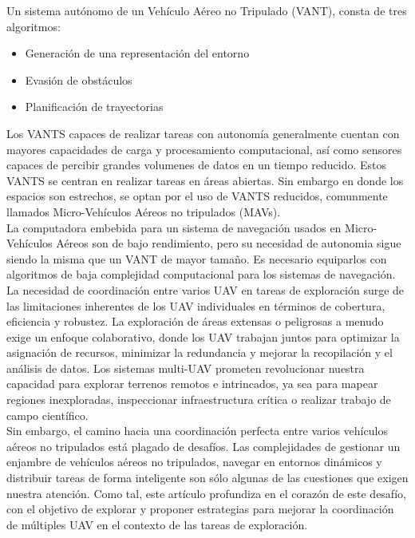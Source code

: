 \documentclass[sigconf]{acmart}
\begin{document}
Un sistema autónomo de un Vehículo Aéreo no Tripulado (VANT), consta de tres algoritmos:

\begin{itemize}
\item Generación de una representación del entorno
\item Evasión de obstáculos
\item Planificación de trayectorias
\end{itemize}

Los VANTS capaces de realizar tareas con autonomía generalmente cuentan con mayores capacidades de carga y procesamiento computacional, así como sensores capaces de percibir grandes volumenes de datos en un tiempo reducido. Estos VANTS se centran en realizar tareas en áreas abiertas. Sin embargo en donde los espacios son estrechos, se optan por el uso de VANTS reducidos, comunmente llamados Micro-Vehículos Aéreos no tripulados (MAVs).\\

La computadora embebida para un sistema de navegación usados en Micro-Vehículos Aéreos son de bajo rendimiento, pero su necesidad de autonomia sigue siendo la misma que un VANT de mayor tamaño. Es necesario equiparlos con algoritmos de baja complejidad computacional para los sistemas de navegación.\\

La necesidad de coordinación entre varios UAV en tareas de exploración surge de las limitaciones inherentes de los UAV individuales en términos de cobertura, eficiencia y robustez. La exploración de áreas extensas o peligrosas a menudo exige un enfoque colaborativo, donde los UAV trabajan juntos para optimizar la asignación de recursos, minimizar la redundancia y mejorar la recopilación y el análisis de datos. Los sistemas multi-UAV prometen revolucionar nuestra capacidad para explorar terrenos remotos e intrincados, ya sea para mapear regiones inexploradas, inspeccionar infraestructura crítica o realizar trabajo de campo científico.\\

Sin embargo, el camino hacia una coordinación perfecta entre varios vehículos aéreos no tripulados está plagado de desafíos. Las complejidades de gestionar un enjambre de vehículos aéreos no tripulados, navegar en entornos dinámicos y distribuir tareas de forma inteligente son sólo algunas de las cuestiones que exigen nuestra atención. Como tal, este artículo profundiza en el corazón de este desafío, con el objetivo de explorar y proponer estrategias para mejorar la coordinación de múltiples UAV en el contexto de las tareas de exploración.\\
\end{document}
